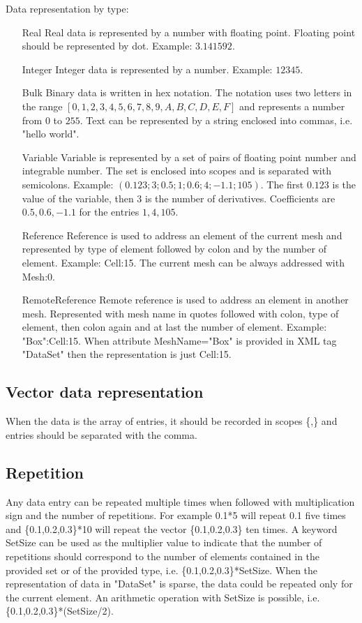 \documentclass[14pt]{article}
\begin{document}
Data representation by type:
\begin{itemize}
\item[Real] Real data is represented by a number with floating point. Floating point should be represented by dot. Example: $3.141592$.
\item[Integer] Integer data is represented by a number. Example: $12345$.
\item[Bulk] Binary data is written in hex notation. The notation uses two letters in the range $[0,1,2,3,4,5,6,7,8,9,A,B,C,D,E,F]$ and represents a number from $0$ to $255$. Text can be represented by a string enclosed into commas, i.e. "hello world".
\item[Variable] Variable is represented by a set of pairs of floating point number and integrable number. The set is enclosed into scopes and is separated with semicolons. Example: $(0.123;3;0.5;1;0.6;4;-1.1;105)$. The first $0.123$ is the value of the variable, then $3$ is the number of derivatives. Coefficients are $0.5, 0.6, -1.1$ for the entries $1, 4, 105$.
\item[Reference] Reference is used to address an element of the current mesh and represented by type of element followed by colon and by the number of element. Example: Cell:15. The current mesh can be always addressed with Mesh:0.
\item[RemoteReference] Remote reference is used to address an element in another mesh. Represented with mesh name in quotes followed with colon, type of element, then colon again and at last the number of element. Example: "Box":Cell:15. When attribute MeshName="Box" is provided in XML tag "DataSet" then the representation is just Cell:15.
\end{itemize}

\subsection{Vector data representation}
When the data is the array of entries, it should be recorded in scopes \{,\} and entries should be separated with the comma. 

\subsection{Repetition}
Any data entry can be repeated multiple times when followed with multiplication sign and the number of repetitions. For example 0.1*5 will repeat 0.1 five times and \{0.1,0.2,0.3\}*10 will repeat the vector \{0.1,0.2,0.3\} ten times. A keyword SetSize can be used as the  multiplier value to indicate that the number of repetitions should correspond to the number of elements contained in the provided set or of the provided type, i.e. \{0.1,0.2,0.3\}*SetSize. When the representation of data in "DataSet" is sparse, the data could be repeated only for the current element. An arithmetic operation with SetSize is possible, i.e.  \{0.1,0.2,0.3\}*(SetSize/2).
\end{document}
